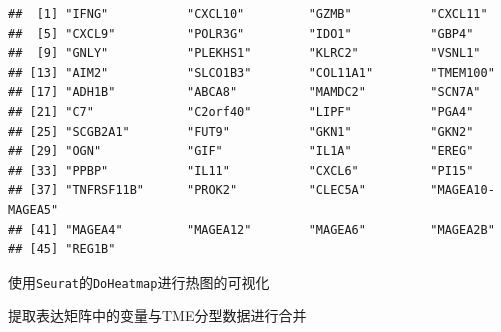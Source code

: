 \documentclass[
  12pt,
]{book}
\newenvironment{Shaded}{\begin{snugshade}}{\end{snugshade}}
\newcommand{\AttributeTok}[1]{\textcolor[rgb]{0.13,0.29,0.53}{#1}}
\newcommand{\CommentTok}[1]{\textcolor[rgb]{0.56,0.35,0.01}{\textit{#1}}}
\newcommand{\ConstantTok}[1]{\textcolor[rgb]{0.56,0.35,0.01}{#1}}
\newcommand{\DecValTok}[1]{\textcolor[rgb]{0.00,0.00,0.81}{#1}}
\newcommand{\FunctionTok}[1]{\textcolor[rgb]{0.13,0.29,0.53}{\textbf{#1}}}
\newcommand{\NormalTok}[1]{#1}
\newcommand{\OtherTok}[1]{\textcolor[rgb]{0.56,0.35,0.01}{#1}}
\newcommand{\SpecialCharTok}[1]{\textcolor[rgb]{0.81,0.36,0.00}{\textbf{#1}}}
\newcommand{\StringTok}[1]{\textcolor[rgb]{0.31,0.60,0.02}{#1}}
\theoremstyle{definition}
\theoremstyle{definition}
\theoremstyle{definition}
\theoremstyle{definition}
\theoremstyle{remark}
\begin{document}
\begin{verbatim}
##  [1] "IFNG"           "CXCL10"         "GZMB"           "CXCL11"        
##  [5] "CXCL9"          "POLR3G"         "IDO1"           "GBP4"          
##  [9] "GNLY"           "PLEKHS1"        "KLRC2"          "VSNL1"         
## [13] "AIM2"           "SLCO1B3"        "COL11A1"        "TMEM100"       
## [17] "ADH1B"          "ABCA8"          "MAMDC2"         "SCN7A"         
## [21] "C7"             "C2orf40"        "LIPF"           "PGA4"          
## [25] "SCGB2A1"        "FUT9"           "GKN1"           "GKN2"          
## [29] "OGN"            "GIF"            "IL1A"           "EREG"          
## [33] "PPBP"           "IL11"           "CXCL6"          "PI15"          
## [37] "TNFRSF11B"      "PROK2"          "CLEC5A"         "MAGEA10-MAGEA5"
## [41] "MAGEA4"         "MAGEA12"        "MAGEA6"         "MAGEA2B"       
## [45] "REG1B"
\end{verbatim}

使用\texttt{Seurat}的\texttt{DoHeatmap}进行热图的可视化

\begin{Shaded}
\end{Shaded}

提取表达矩阵中的变量与TME分型数据进行合并

\begin{Shaded}
\end{Shaded}
\end{document}
